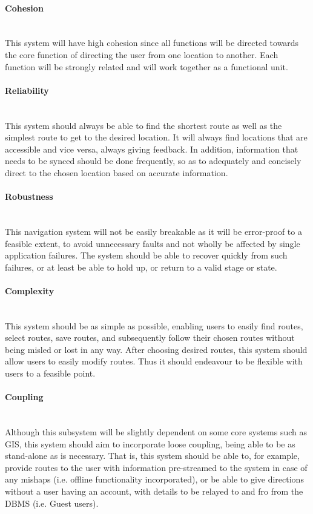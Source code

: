 	\paragraph{Cohesion}
	\mbox{}\\
	This system will have high cohesion since all functions will be directed towards the core
	 function of directing the user from one location to another. Each function will be
	  strongly related and will work together as a functional unit.
	  
	\paragraph{Reliability}
	\mbox{}\\
	This system should always be able to find the shortest route as well as the simplest route 
	to get to the desired location. It will always find locations that are accessible and vice 
	versa, always giving feedback. In addition, information that needs to be synced should be done
	frequently, so as to adequately and concisely direct to the chosen location based on accurate
	information. 
	
	\paragraph{Robustness}
	\mbox{}\\
	This navigation system will not be easily breakable as it will be error-proof to a feasible 
	extent, to avoid unnecessary faults and not wholly be affected by single application failures. 
	The system should be able to recover quickly from such failures, or at least be able to 
	hold up, or return to a valid stage or state.
	
	\paragraph{Complexity}
	\mbox{}\\
	This system should be as simple as possible, enabling users to easily find routes, select routes,
	save routes, and subsequently follow their chosen routes without being misled or lost in any way.  
	After choosing desired routes, this system should allow users to easily modify routes. Thus it should
	endeavour to be flexible with users to a feasible point.
	
	\paragraph{Coupling}
	\mbox{}\\
	Although this subsystem will be slightly dependent on some core systems such as GIS, this system
	should aim to incorporate loose coupling, being able to be as stand-alone as is necessary. 
	That is, this system should be able to, for example, provide routes to the user with information 
	pre-streamed to the system in case of any mishaps (i.e. offline functionality incorporated),
	or be able to give directions without a user having an account, with details to be relayed to and 
	fro from the DBMS (i.e. Guest users).
	
